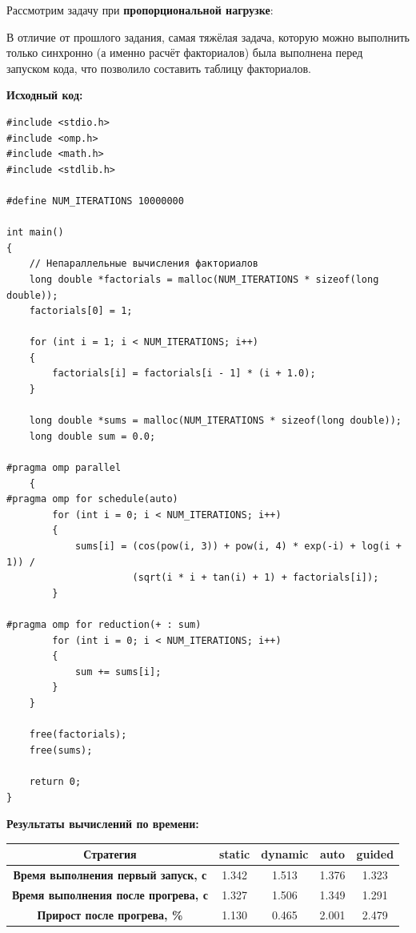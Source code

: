 \documentclass[a4paper,14pt]{extarticle}
\begin{document}
Рассмотрим задачу при \textbf{пропорциональной нагрузке}:

В отличие от прошлого задания, самая тяжёлая задача, которую можно выполнить только синхронно (а именно расчёт
факториалов) была выполнена перед запуском кода, что позволило составить таблицу факториалов. 

\textbf{Исходный код:}
\begin{verbatim}
#include <stdio.h>
#include <omp.h>
#include <math.h>
#include <stdlib.h>

#define NUM_ITERATIONS 10000000

int main()
{
    // Непараллельные вычисления факториалов
    long double *factorials = malloc(NUM_ITERATIONS * sizeof(long double));
    factorials[0] = 1;

    for (int i = 1; i < NUM_ITERATIONS; i++)
    {
        factorials[i] = factorials[i - 1] * (i + 1.0);
    }

    long double *sums = malloc(NUM_ITERATIONS * sizeof(long double));
    long double sum = 0.0;

#pragma omp parallel
    {
#pragma omp for schedule(auto)
        for (int i = 0; i < NUM_ITERATIONS; i++)
        {
            sums[i] = (cos(pow(i, 3)) + pow(i, 4) * exp(-i) + log(i + 1)) /
                      (sqrt(i * i + tan(i) + 1) + factorials[i]);
        }

#pragma omp for reduction(+ : sum)
        for (int i = 0; i < NUM_ITERATIONS; i++)
        {
            sum += sums[i];
        }
    }

    free(factorials);
    free(sums);

    return 0;
}
\end{verbatim}

\textbf{Результаты вычислений по времени:}\\
\begin{tabular}{|c|c|c|c|c|}
    \hline
    \textbf{Стратегия}                          & static & dynamic & auto  & guided \\ 
    \hline
    \textbf{Время выполнения первый запуск, с}  & 1.342  & 1.513   & 1.376 & 1.323 \\
    \hline
    \textbf{Время выполнения после прогрева, с} & 1.327  & 1.506   & 1.349 & 1.291 \\
    \hline
    \textbf{Прирост после прогрева, \%}         & 1.130  & 0.465   & 2.001 & 2.479 \\
    \hline
\end{tabular}\\
\end{document}
